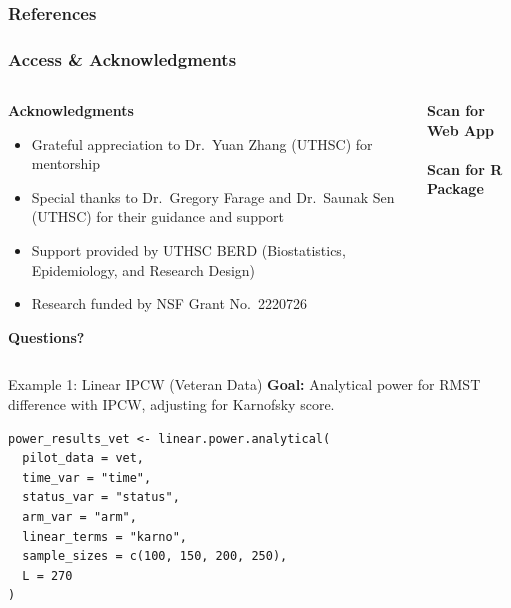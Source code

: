 \documentclass{beamer}
\begin{document}
\begin{frame}[allowframebreaks]
\frametitle{References}
\scriptsize


\end{frame}

\begin{frame}
\frametitle{Access \& Acknowledgments}
\begin{columns}[T]
\begin{column}{0.5\textwidth}
\scriptsize
    \textbf{Acknowledgments}
 \begin{itemize}
        \item Grateful appreciation to Dr.\ Yuan Zhang (UTHSC) for mentorship
        \item Special thanks to Dr.\ Gregory Farage and Dr.\ Saunak Sen (UTHSC) for their guidance and support
        \item Support provided by UTHSC BERD (Biostatistics, Epidemiology, and Research Design)
        \item Research funded by NSF Grant No.\ 2220726
    \end{itemize}
\vfill
\begin{center}
\Huge{\textbf{Questions?}}
\end{center}
\end{column}
    \begin{column}{0.5\textwidth}
    \scriptsize
        \centering
        \textbf{Scan for Web App} \\
        \vspace{2em}
        \\
        \textbf{Scan for R Package} \\
    \end{column}
\end{columns}
\end{frame}



\begin{frame}[fragile]{Example 1: Linear IPCW (Veteran Data)}
\textbf{Goal:} Analytical power for RMST difference with IPCW, adjusting for Karnofsky score.

\begin{verbatim}
power_results_vet <- linear.power.analytical(
  pilot_data = vet,
  time_var = "time",
  status_var = "status",
  arm_var = "arm",
  linear_terms = "karno",
  sample_sizes = c(100, 150, 200, 250),
  L = 270
)
\end{verbatim}

\end{frame}
\end{document}
